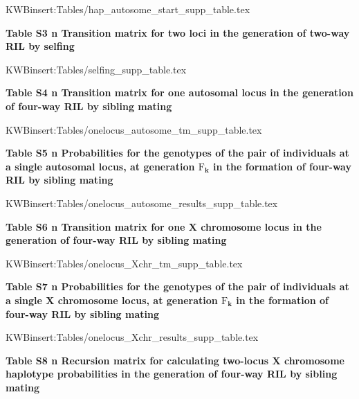 \documentclass[9pt,letterpaper,twoside]{article}
\begin{document}
{
KWBinsert:Tables/hap_autosome_start_supp_table.tex
}

\bigskip

\newpage

\noindent \textbf{Table S3 {\color{white} n} Transition matrix for two loci
in the generation of two-way RIL by selfing}

\bigskip

{
KWBinsert:Tables/selfing_supp_table.tex
}

\newpage


\noindent \textbf{Table S4 {\color{white} n} Transition matrix for one autosomal locus
in the generation of four-way RIL by sibling mating}

\bigskip

{
KWBinsert:Tables/onelocus_autosome_tm_supp_table.tex
}

\newpage


\noindent \textbf{Table S5 {\color{white} n} Probabilities for the genotypes of the 
pair of individuals at a single autosomal locus, at generation $\text{F}_{\boldsymbol{k}}$
in the formation of four-way RIL by sibling mating}

\bigskip

{
KWBinsert:Tables/onelocus_autosome_results_supp_table.tex
}

\newpage


\noindent \textbf{Table S6 {\color{white} n} Transition matrix for one X chromosome
locus in the generation of four-way RIL by sibling mating}

\bigskip

{
KWBinsert:Tables/onelocus_Xchr_tm_supp_table.tex
}

\newpage

\noindent \textbf{Table S7 {\color{white} n} Probabilities for the genotypes of the 
pair of individuals at a single X chromosome locus, at generation $\text{F}_{\boldsymbol{k}}$
in the formation of four-way RIL by sibling mating}

\bigskip

{
KWBinsert:Tables/onelocus_Xchr_results_supp_table.tex
}

\newpage


\noindent \textbf{Table S8 {\color{white} n} Recursion matrix for calculating
two-locus X chromosome haplotype probabilities in the generation of four-way RIL by
sibling mating}

\bigskip
\end{document}
